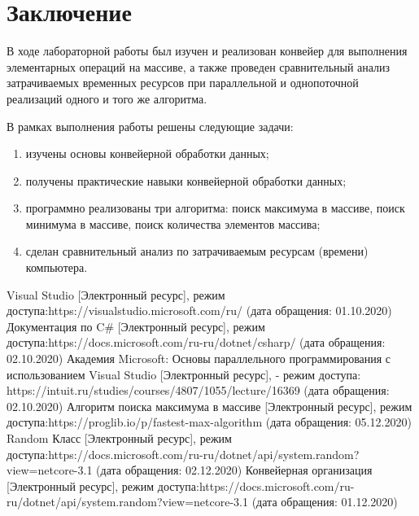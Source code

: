 \documentclass[12pt]{report}
\begin{document}
\chapter*{Заключение}
В ходе лабораторной работы был изучен и реализован конвейер для выполнения элементарных операций на массиве, а также проведен сравнительный анализ затрачиваемых временных ресурсов при параллельной и однопоточной реализаций одного и того же алгоритма. 

В рамках выполнения работы решены следующие задачи:

\begin{enumerate}
\item изучены основы конвейерной обработки данных;
\item  получены практические навыки конвейерной обработки данных;
\item программно реализованы три алгоритма: поиск максимума в массиве, поиск минимума в массиве, поиск количества элементов массива;
\item сделан сравнительный анализ по затрачиваемым ресурсам (времени) компьютера.
\end{enumerate}

%
%

\begin{thebibliography}{3}
	Visual Studio [Электронный ресурс], режим доступа:https://visualstudio.microsoft.com/ru/ (дата обращения: 01.10.2020)
	Документация по C\# [Электронный ресурс], режим доступа:https://docs.microsoft.com/ru-ru/dotnet/csharp/ (дата обращения: 02.10.2020)
	Академия Microsoft: Основы параллельного программирования с использованием Visual Studio [Электронный ресурс], - режим доступа: https://intuit.ru/studies/courses/4807/1055/lecture/16369 (дата обращения: 02.10.2020)
	 Алгоритм поиска максимума в массиве [Электронный ресурс], режим доступа:https://proglib.io/p/fastest-max-algorithm (дата обращения: 05.12.2020)
	Random Класс [Электронный ресурс], режим доступа:https://docs.microsoft.com/ru-ru/dotnet/api/system.random?view=netcore-3.1 (дата обращения: 02.12.2020)
	Конвейерная организация [Электронный ресурс], режим доступа:https://docs.microsoft.com/ru-ru/dotnet/api/system.random?view=netcore-3.1 (дата обращения: 01.12.2020)
\end{thebibliography}
\end{document}

